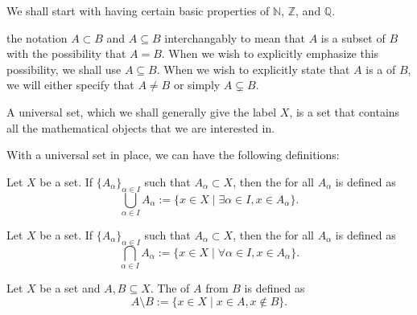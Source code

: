 \documentclass[notoc,notitlepage]{tufte-book}
\begin{document}
We shall start with having certain basic properties of $\mathbb{N}$, $\mathbb{Z}$, and $\mathbb{Q}$.

 the notation $A \subset B$ and $A \subseteq B$ interchangably to mean that $A$ is a subset of $B$ with the possibility that $A = B$. When we wish to explicitly emphasize this possibility, we shall use $A \subseteq B$. When we wish to explicitly state that $A$ is a  of $B$, we will either specify that $A \neq B$ or simply $A \subsetneq B$.

\begin{defn}\label{defn:universal_set}
  A universal set, which we shall generally give the label $X$, is a set that contains all the mathematical objects that we are interested in.
\end{defn}

With a universal set in place, we can have the following definitions:

\begin{defn}[Union]\label{defn:union}
  Let $X$ be a set. If ${\{A_\alpha\}}_{\alpha \in I}$ such that $A_{\alpha} \subset X$, then the  for all $A_{\alpha}$ is defined as
  \begin{equation*}
    \bigcup_{\alpha \in I} A_{\alpha} := \{ x \in X \mid \exists \alpha \in I, x \in A_{\alpha} \}.
  \end{equation*}
\end{defn}

\begin{defn}[Intersection]\label{defn:intersection}
  Let $X$ be a set. If ${\{A_\alpha\}}_{\alpha \in I}$ such that $A_\alpha \subset X$, then the  for all $A_\alpha$ is defined as
  \begin{equation*}
    \bigcap_{\alpha \in I} A_\alpha := \{ x \in X \mid \forall \alpha \in I, x \in A_\alpha \}.
  \end{equation*}
\end{defn}

\begin{defn}\label{defn:set_difference}
  Let $X$ be a set and $A, B \subseteq X$. The  of $A$ from $B$ is defined as
  \begin{equation*}
    A \setminus B := \{ x \in X \mid x \in A, x \notin B \}.
  \end{equation*}
\end{defn}
\end{document}
